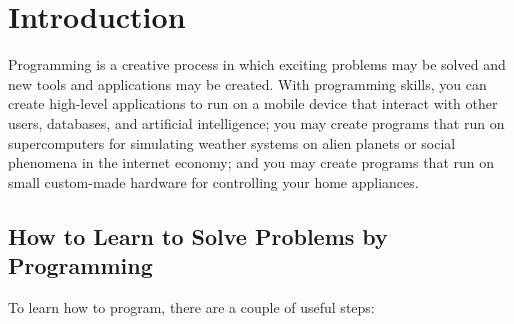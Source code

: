 \documentclass[fsharpNotes.tex]{subfiles}
\begin{document}
\chapter{Introduction}
\label{chap:introduction}
Programming is a creative process in which exciting problems may be solved and new tools and applications may be created. With programming skills, you can create high-level applications to run on a mobile device that interact with other users, databases, and artificial intelligence; you may create programs that run on supercomputers for simulating weather systems on alien planets or social phenomena in the internet economy; and you may create programs that run on small custom-made hardware for controlling your home appliances. 

\section{How to Learn to Solve Problems by Programming}
To learn how to program, there are a couple of useful steps:
\end{document}
